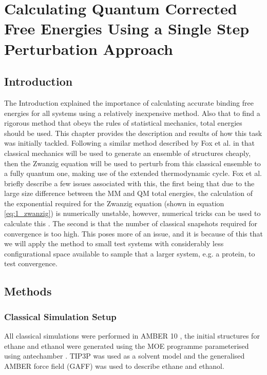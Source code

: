 \chapter{Calculating Quantum Corrected Free Energies Using a Single Step Perturbation Approach} \label{Chapter:single_step}

\section{Introduction}

The Introduction explained the importance of calculating accurate binding free energies for all systems using a relatively inexpensive method.  Also that to find a rigorous method that obeys the rules of statistical mechanics, total energies should be used.  This chapter provides the description and results of how this task was initially tackled.  Following a similar method described by Fox et al. \cite{fox_mm_to_qm} in that classical mechanics will be used to generate an ensemble of structures cheaply, then the Zwanzig equation \cite{zwanzig} will be used to perturb from this classical ensemble to a fully quantum one, making use of the extended thermodynamic cycle.  Fox et al. \cite{fox_mm_to_qm} briefly describe a few issues associated with this, the first being that due to the large size difference between the MM and QM total energies, the calculation of the exponential required for the Zwanzig equation (shown in equation \ref{eq:1_zwanzig}) is numerically unstable, however, numerical tricks can be used to calculate this \cite{Berg_maths}.  The second is that the number of classical snapshots required for convergence is too high.  This poses more of an issue, and it is because of this that we will apply the method to small test systems with considerably less configurational space available to sample that a larger system, e.g. a protein, to test convergence.


\section{Methods} \label{sec:results_ch1_methods}

\subsection{Classical Simulation Setup}

All classical simulations were performed in AMBER 10 \cite{amber_ref}, the initial structures for ethane and ethanol were generated using the MOE programme \cite{moe2009} parameterised using antechamber \cite{antechamber}.  TIP3P \cite{tip4p} was used as a solvent model and the generalised AMBER force field (GAFF) \cite{gaff} was used to describe ethane and ethanol.

